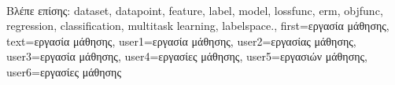 {{%
		\\
	 	\foreignlanguage{greek}{Βλέπε επίσης:} \gls{dataset}, \gls{datapoint}, \gls{feature}, \gls{label}, \gls{model}, 
		\gls{lossfunc}, \gls{erm}, \gls{objfunc}, \gls{regression}, \gls{classification}, \gls{multitask learning}, \gls{labelspace}.},
	first={\foreignlanguage{greek}{εργασία μάθησης}},
	text={\foreignlanguage{greek}{εργασία μάθησης}},
	user1={\foreignlanguage{greek}{εργασία μάθησης}}, %
	user2={\foreignlanguage{greek}{εργασίας μάθησης}}, %
	user3={\foreignlanguage{greek}{εργασία μάθησης}}, %
	user4={\foreignlanguage{greek}{εργασίες μάθησης}}, %
	user5={\foreignlanguage{greek}{εργασιών μάθησης}}, %
	user6={\foreignlanguage{greek}{εργασίες μάθησης}} %
}

